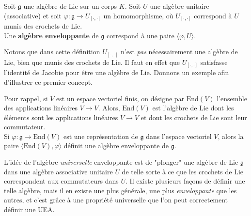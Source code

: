 \documentclass{article}
\begin{document}
\begin{definition}{}
    Soit $\mathfrak{g}$ une algèbre de Lie sur un corps $K$. Soit $U$ une algèbre unitaire (associative) et soit $\varphi:\mathfrak{g}\to U_{[\cdot,\cdot]}$ un homomorphisme, où $U_{[\cdot,\cdot]}$ correspond à $U$ munis des crochets de Lie.\\

    \noindent
    Une \textbf{algèbre enveloppante} de $\mathfrak{g}$ correspond à une paire $\langle\varphi,U\rangle$.
\end{definition}

\noindent
Notons que dans cette définition $U_{[\cdot,\cdot]}$ n'est \textit{pas} nécessairement une algèbre de Lie, bien que munis des crochets de Lie. Il faut en effet que $U_{[\cdot,\cdot]}$ satisfasse l'identité de Jacobie pour être une algèbre de Lie. Donnons un exemple afin d'illustrer ce premier concept.

\begin{example}[]{}
    Pour rappel, si $V$ est un espace vectoriel finis, on désigne par $\text{End}(V)$ l'ensemble des applications linéaires $V\to V$. Alors, $\text{End}(V)$ est l'algèbre de Lie dont les éléments sont les applications linéaires $V\to V$ et dont les crochets de Lie sont leur commutateur.\\

    \noindent
    Si $\varphi:\mathfrak{g}\to\text{End}(V)$ est une représentation de $\mathfrak{g}$ dans l'espace vectoriel $V$, alors la paire $\langle\text{End}(V), \varphi\rangle$ définit une algèbre enveloppante de $\mathfrak{g}$.\\
\end{example}

L'idée de l'algèbre \textit{universelle} enveloppante est de "plonger" une algèbre de Lie $\mathfrak{g}$ dans une algèbre associative unitaire $U$ de telle sorte à ce que les crochets de Lie correspondent aux commutateurs dans $U$. Il existe plusieurs façons de définir une telle algèbre, mais il en existe une plus générale, une plus \textit{enveloppante} que les autres, et c'est grâce à une propriété universelle que l'on peut correctement définir une UEA.
\end{document}
